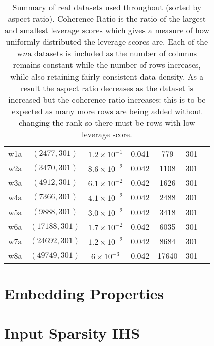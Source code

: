 \documentclass[twoside]{article}
\theoremstyle{definition}\newtheorem{thm}{Theorem}[section]
\theoremstyle{definition}\newtheorem{mydef}[thm]{Definition}
\theoremstyle{definition}\newtheorem{rem}[thm]{Remark}
\theoremstyle{definition}\newtheorem{prop}[thm]{Proposition}
\theoremstyle{definition}\newtheorem{example}[thm]{Example}
\theoremstyle{definition}\newtheorem{claim}[thm]{Claim}
\theoremstyle{definition}\newtheorem{Qu}[thm]{Question}
\theoremstyle{definition}\newtheorem{Lemma}[thm]{Lemma}
\theoremstyle{definition}\newtheorem{Cor}[thm]{Corollary}
\theoremstyle{definition}\newtheorem{Fact}[]{Fact}
\begin{document}
\begin{table}[ht]
\begin{adjustbox}{width=1\textwidth}
\begin{tabular}{|c|c|c|c|c|c|c|}
\hline

w1a & $(2477, 301)$    & $1.2 \times 10^{-1}$ & 0.041 & 779 & 301 & \cite{platt199912} \\

w2a & $(3470, 301)$    & $8.6 \times 10^{-2}$ & 0.042 & 1108 & 301 & \cite{platt199912} \\

w3a & $(4912, 301)$    & $6.1 \times 10^{-2}$ & 0.042 & 1626 & 301 & \cite{platt199912} \\

w4a & $(7366, 301)$    & $4.1 \times 10^{-2}$ & 0.042 & 2488 & 301 & \cite{platt199912} \\

w5a & $(9888, 301)$    & $3.0 \times 10^{-2}$ & 0.042 & 3418 & 301 & \cite{platt199912} \\

w6a & $(17188, 301)$ & $1.7 \times 10^{-2}$ & 0.042 & 6035 & 301 & \cite{platt199912} \\

w7a & $(24692, 301)$   & $1.2 \times 10^{-2}$ & 0.042 & 8684 & 301 & \cite{platt199912} \\

w8a & $(49749, 301)$    & $6 \times 10^{-3}$   & 0.042 & 17640 & 301 & \cite{platt199912} \\
\hline
\end{tabular}
\end{adjustbox}
\caption{Summary of real datasets used throughout (sorted by aspect ratio).
Coherence Ratio is the ratio of the largest and smallest leverage scores which
gives a measure of how uniformly distributed the leverage scores are.
Each of the w$n$a datasets is included as the number of columns remains constant
while the number of rows increases, while also retaining fairly consistent
data density.
As a result the aspect ratio decreases as the dataset is increased but the
coherence ratio increases: this is to be expected as many more rows are being
added without changing the rank so there must be rows with low leverage score.}
\label{table: data-facts}
\end{table}




\section{Embedding Properties} \label{sec: subspace-embedding-results}



\section{Input Sparsity IHS} \label{sec: countsketch-ihs}

\end{document}
